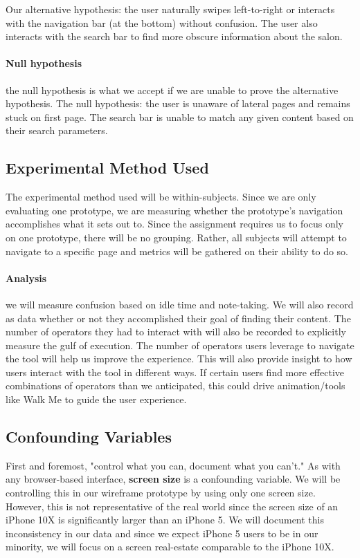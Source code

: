 Our alternative hypothesis: the user naturally swipes left-to-right or interacts with the navigation bar (at the bottom) without confusion. The user also interacts with the search bar to find more obscure information about the salon.

\paragraph{Null hypothesis} the null hypothesis is what we accept if we are unable to prove the alternative hypothesis. The null hypothesis: the user is unaware of lateral pages and remains stuck on first page. The search bar is unable to match any given content based on their search parameters.

\subsection{Experimental Method Used}
The experimental method used will be within-subjects. Since we are only evaluating one prototype, we are measuring whether the prototype's navigation accomplishes what it sets out to. Since the assignment requires us to focus only on one prototype, there will be no grouping. Rather, all subjects will attempt to navigate to a specific page and metrics will be gathered on their ability to do so.

\paragraph{Analysis} we will measure confusion based on idle time and note-taking. We will also record as data whether or not they accomplished their goal of finding their content. The number of operators they had to interact with will also be recorded to explicitly measure the gulf of execution. The number of operators users leverage to navigate the tool will help us improve the experience. This will also provide insight to how users interact with the tool in different ways. If certain users find more effective combinations of operators than we anticipated, this could drive animation/tools like Walk Me to guide the user experience.

\subsection{Confounding Variables}
First and foremost, "control what you can, document what you can't." As with any browser-based interface, \textbf{screen size} is a confounding variable. We will be controlling this in our wireframe prototype by using only one screen size. However, this is not representative of the real world since the screen size of an iPhone 10X is significantly larger than an iPhone 5. We will document this inconsistency in our data and since we expect iPhone 5 users to be in our minority, we will focus on a screen real-estate comparable to the iPhone 10X.

